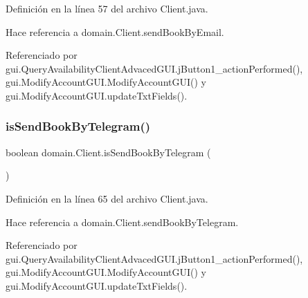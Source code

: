 Definición en la línea 57 del archivo Client.\+java.


\begin{DoxyCode}{0}

\end{DoxyCode}


Hace referencia a domain.\+Client.\+send\+Book\+By\+Email.



Referenciado por gui.\+Query\+Availability\+Client\+Advaced\+G\+U\+I.\+j\+Button1\+\_\+action\+Performed(), gui.\+Modify\+Account\+G\+U\+I.\+Modify\+Account\+G\+U\+I() y gui.\+Modify\+Account\+G\+U\+I.\+update\+Txt\+Fields().

\mbox{\label{classdomain_1_1_client_aa00c95082f42ebd0bcd252ffa7f5b89b}} 
\subsubsection{\texorpdfstring{isSendBookByTelegram()}{isSendBookByTelegram()}}
{\footnotesize\ttfamily boolean domain.\+Client.\+is\+Send\+Book\+By\+Telegram (\begin{DoxyParamCaption}{ }\end{DoxyParamCaption})}



Definición en la línea 65 del archivo Client.\+java.


\begin{DoxyCode}{0}

\end{DoxyCode}


Hace referencia a domain.\+Client.\+send\+Book\+By\+Telegram.



Referenciado por gui.\+Query\+Availability\+Client\+Advaced\+G\+U\+I.\+j\+Button1\+\_\+action\+Performed(), gui.\+Modify\+Account\+G\+U\+I.\+Modify\+Account\+G\+U\+I() y gui.\+Modify\+Account\+G\+U\+I.\+update\+Txt\+Fields().

